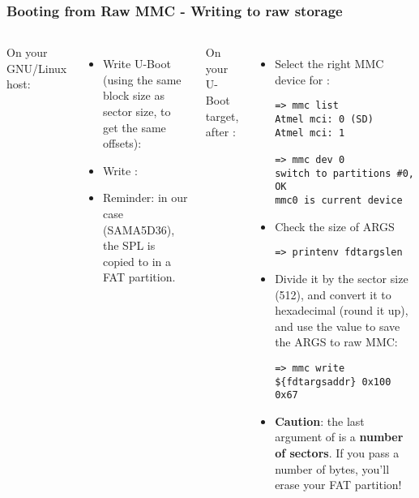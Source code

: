 \begin{frame}[fragile]
\frametitle{Booting from Raw MMC - Writing to raw storage}
   \scriptsize
   \begin{columns}
    On your GNU/Linux host:
    \begin{itemize}
        \item Write U-Boot (using the same block size as sector size, to
              get the same offsets):\\
        \item Write :\\
        \item Reminder: in our case (SAMA5D36), the SPL is copied to
               in a FAT partition.
    \end{itemize}
    On your U-Boot target,\\
    after :
    \begin{itemize}
        \item Select the right MMC\\
        device for :
        \begin{verbatim}
=> mmc list
Atmel mci: 0 (SD)
Atmel mci: 1

=> mmc dev 0
switch to partitions #0, OK
mmc0 is current device
\end{verbatim}
        \item Check the size of ARGS
\begin{verbatim}
=> printenv fdtargslen
\end{verbatim}

        \item Divide it by the sector size (512), and convert it to
              hexadecimal (round it up), and use the value to save the ARGS to raw MMC:
\begin{verbatim}
=> mmc write ${fdtargsaddr} 0x100 0x67
\end{verbatim}
        \item {\bf Caution}: the last argument of  is a
              {\bf number of sectors}. If you pass a number of bytes, you'll erase your
              FAT partition!
    \end{itemize}
   \end{columns}
\end{frame}


